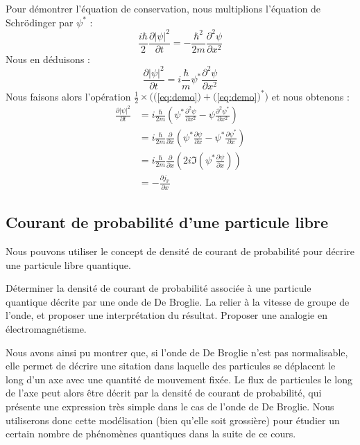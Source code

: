 \documentclass[11pt,fleqn]{book} %
\begin{document}
\begin{demonstration}
	Pour démontrer l'équation de conservation, nous multiplions l'équation de Schrödinger par $\psi^\ast$ :
	\begin{equation}
		\frac{i \hbar}{2} \frac{\partial |\psi|^2}{\partial t} = - \frac{\hbar^2}{2m} \frac{\partial^2 \psi}{\partial x^2}
	\end{equation}
	Nous en déduisons :
	\begin{equation}
		\frac{\partial |\psi|^2}{\partial t} = i \frac{\hbar}{m} \psi^\ast \frac{\partial^2 \psi}{\partial x^2}
		\label{eq:demo}
	\end{equation}
	Nous faisons alors l'opération $\frac{1}{2} \times (($\ref{eq:demo}$)+($\ref{eq:demo}$)^\ast)$ et nous obtenons :
	\begin{align}
		\frac{\partial |\psi|^2}{\partial t} &= i \frac{\hbar}{2m} \left( \psi^\ast \frac{\partial^2 \psi}{\partial x^2} - \psi \frac{\partial^2 \psi^\ast}{\partial x^2} \right) \\
		&= i \frac{\hbar}{2m} \frac{\partial}{\partial x} \left( \psi^\ast \frac{\partial \psi}{\partial x} - \psi^\ast \frac{\partial \psi^\ast}{\partial x} \right) \\
		&= i \frac{\hbar}{2m} \frac{\partial}{\partial x} \left( 2 i \Im \left( \psi^\ast \frac{\partial \psi}{\partial x} \right) \right) \\
		&= - \frac{\partial j_{\mathbb{P}}}{\partial x}
	\end{align}
\end{demonstration}

\subsection{Courant de probabilité d'une particule libre}

Nous pouvons utiliser le concept de densité de courant de probabilité pour décrire une particule libre quantique.

\begin{capex}
	Déterminer la densité de courant de probabilité associée à une particule quantique décrite par une onde de De Broglie. La relier à la vitesse de groupe de l'onde, et proposer une interprétation du résultat. Proposer une analogie en électromagnétisme.
\end{capex}

Nous avons ainsi pu montrer que, si l'onde de De Broglie n'est pas normalisable, elle permet de décrire une sitation dans laquelle des particules se déplacent le long d'un axe avec une quantité de mouvement fixée. Le flux de particules le long de l'axe peut alors être décrit par la densité de courant de probabilité, qui présente une expression très simple dans le cas de l'onde de De Broglie. Nous utiliserons donc cette modélisation (bien qu'elle soit grossière) pour étudier un certain nombre de phénomènes quantiques dans la suite de ce cours.
\end{document}

